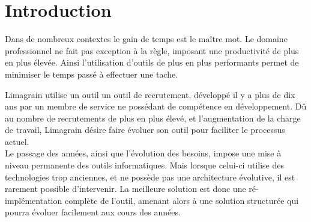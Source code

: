 \cleardoublepage

\chapter*{Introduction}





Dans de nombreux contextes le gain de temps est le maître mot.
Le domaine professionnel ne fait pas exception à la règle, imposant une productivité de plus en plus élevée.
Ainsi l'utilisation d'outils de plus en plus performants permet de minimiser le temps passé à effectuer une tache.


Limagrain utilise un outil un outil de recrutement, développé il y a plus de dix ans par un membre de service ne possédant de compétence en développement.
Dû au nombre de recrutements de plus en plus élevé, et  l'augmentation de la charge de travail, Limagrain désire faire évoluer son outil pour faciliter le processus actuel.
\\


Le passage des années, ainsi que l'évolution des besoins, impose une mise à niveau permanente des outils informatiques.
Mais lorsque celui-ci utilise des technologies trop anciennes, et ne possède pas une architecture évolutive, il est rarement possible d'intervenir.
La meilleure solution est donc une ré-implémentation complète de l'outil, amenant alors à une solution structurée qui pourra évoluer facilement aux cours des années.
\\


